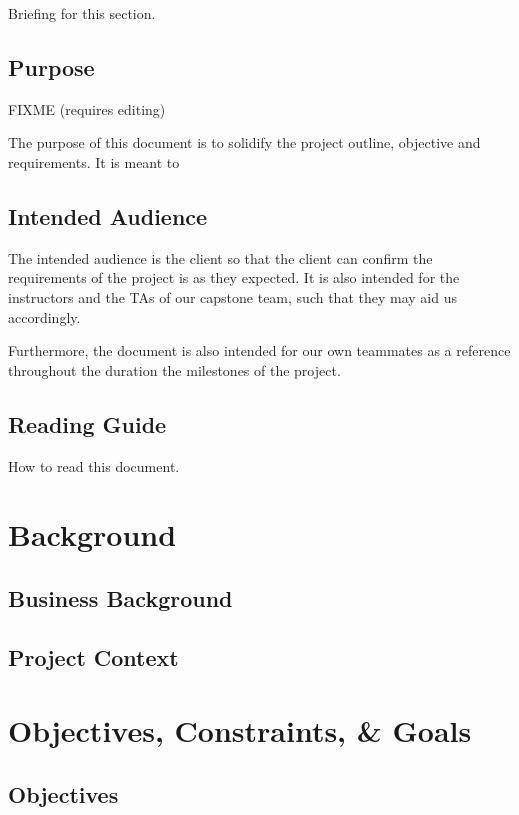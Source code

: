 \documentclass[10pt,letterpaper]{article}
\begin{document}
Briefing for this section.

\subsection{Purpose}
FIXME (requires editing)

The purpose of this document is to solidify the project outline, objective and requirements.
It is meant to 

\subsection{Intended Audience}

The intended audience is the client so that the client can confirm the requirements of the project is as they expected.
It is also intended for the instructors and the TAs of our capstone team, such that
they may aid us accordingly.

Furthermore, the document is also intended for our own teammates as a reference
throughout the duration the milestones of the project.

\subsection{Reading Guide}

How to read this document.

\section{Background}


\subsection{Business Background}


\subsection{Project Context}


\section{Objectives, Constraints, \& Goals}


\subsection{Objectives}

\end{document}
